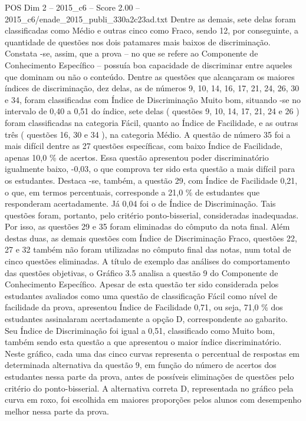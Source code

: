 \begin{textsample}{POS Dim 2 – 2015\_c6 – Score 2.00 – 2015\_c6/enade\_2015\_publi\_330a2c23ad.txt}
Dentre as demais, sete delas foram classificadas como Médio e outras cinco como Fraco, sendo 12, por conseguinte, a quantidade de questões nos dois patamares mais baixos de discriminação.
Constata -se, assim, que a prova – no que se refere ao Componente de Conhecimento Específico – possuía boa capacidade de discriminar entre aqueles que dominam ou não o conteúdo.
Dentre as questões que alcançaram os maiores índices de discriminação, dez delas, as de números 9, 10, 14, 16, 17, 21, 24, 26, 30 e 34, foram classificadas com Índice de Discriminação Muito bom, situando -se no intervalo de 0,40 a 0,51 do índice, sete delas ( questões 9, 10, 14, 17, 21, 24 e 26 ) foram classificadas na categoria Fácil, quanto ao Índice de Facilidade, e as outras três ( questões 16, 30 e 34 ), na categoria Médio.
A questão de número 35 foi a mais difícil dentre as 27 questões específicas, com baixo Índice de Facilidade, apenas 10,0 \% de acertos.
Essa questão apresentou poder discriminatório igualmente baixo, -0,03, o que comprova ter sido esta questão a mais difícil para os estudantes.
Destaca -se, também, a questão 29, com Índice de Facilidade 0,21, o que, em termos percentuais, corresponde a 21,0 \% de estudantes que responderam acertadamente.
Já 0,04 foi o de Índice de Discriminação.
Tais questões foram, portanto, pelo critério ponto-bisserial, consideradas inadequadas.
Por isso, as questões 29 e 35 foram eliminadas do cômputo da nota final.
Além destas duas, as demais questões com Índice de Discriminação Fraco, questões 22, 27 e 32 também não foram utilizadas no cômputo final das notas, num total de cinco questões eliminadas.
A título de exemplo das análises do comportamento das questões objetivas, o Gráfico 3.5 analisa a questão 9 do Componente de Conhecimento Específico.
Apesar de esta questão ter sido considerada pelos estudantes avaliados como uma questão de classificação Fácil como nível de facilidade da prova, apresentou Índice de Facilidade 0,71, ou seja, 71,0 \% dos estudantes assinalaram acertadamente a opção D, correspondente ao gabarito.
Seu Índice de Discriminação foi igual a 0,51, classificado como Muito bom, também sendo esta questão a que apresentou o maior índice discriminatório.
Neste gráfico, cada uma das cinco curvas representa o percentual de respostas em determinada alternativa da questão 9, em função do número de acertos dos estudantes nessa parte da prova, antes de possíveis eliminações de questões pelo critério do ponto-bisserial.
A alternativa correta D, representada no gráfico pela curva em roxo, foi escolhida em maiores proporções pelos alunos com desempenho melhor nessa parte da prova.

\end{textsample}
